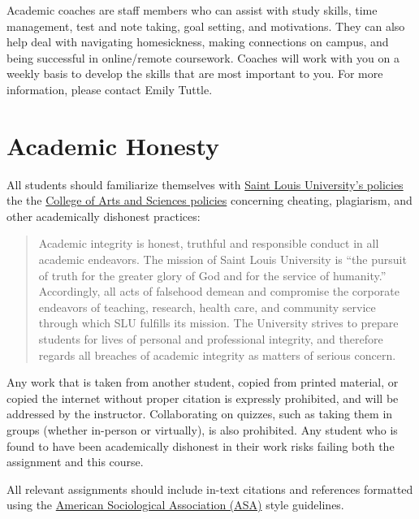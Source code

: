 \documentclass[
]{book}
\begin{document}
Academic coaches are staff members who can assist with study skills, time management, test and note taking, goal setting, and motivations. They can also help deal with navigating homesickness, making connections on campus, and being successful in online/remote coursework. Coaches will work with you on a weekly basis to develop the skills that are most important to you. For more information, please contact Emily Tuttle.

\hypertarget{academic-honesty}{%
\section{Academic Honesty}\label{academic-honesty}}

All students should familiarize themselves with \href{https://www.slu.edu/provost/policies/academic-and-course/policy_academic-integrity_6-26-2015.pdf}{Saint Louis University's policies} the the \href{https://www.slu.edu/arts-and-sciences/student-resources/academic-honesty.php}{College of Arts and Sciences policies} concerning cheating, plagiarism, and other academically dishonest practices:

\begin{quote}
Academic integrity is honest, truthful and responsible conduct in all academic endeavors. The mission of Saint Louis University is ``the pursuit of truth for the greater glory of God and for the service of humanity.'' Accordingly, all acts of falsehood demean and compromise the corporate endeavors of teaching, research, health care, and community service through which SLU fulfills its mission. The University strives to prepare students for lives of personal and professional integrity, and therefore regards all breaches of academic integrity as matters of serious concern.
\end{quote}

Any work that is taken from another student, copied from printed material, or copied the internet without proper citation is expressly prohibited, and will be addressed by the instructor. Collaborating on quizzes, such as taking them in groups (whether in-person or virtually), is also prohibited. Any student who is found to have been academically dishonest in their work risks failing both the assignment and this course.

All relevant assignments should include in-text citations and references formatted using the \href{https://owl.english.purdue.edu/owl/resource/583/1/}{American Sociological Association (ASA)} style guidelines.
\end{document}
